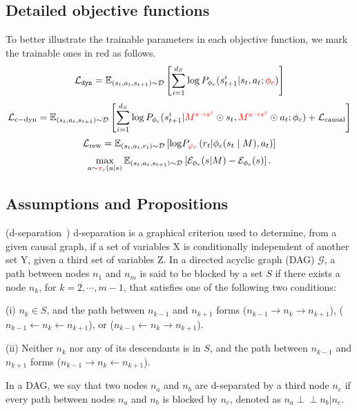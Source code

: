 \subsection{Detailed objective functions}
To better illustrate the trainable parameters in each objective function, we mark the trainable ones in red as follows. 
\begin{equation}
\mathcal{L}_{\texttt{dyn}}= \mathbb{E}_{{(s_t, a_t, s_{t+1})} \sim \mathcal{D} } \left[\sum_{i=1}^{d_S} \log P_{\phi_c}(s_{t+1}^{i} | s_t, a_t; \textcolor{red}{{\phi_c}}) \right]
\end{equation}
\begin{equation}
\mathcal{L}_{\rm{c-dyn}}= \mathbb{E}_{(s_t, a_t, s_{t+1}) \sim \mathcal{D} } \left[\sum_{i=1}^{d_S} \log P_{\phi_{\rm{c}}}(s_{t+1}^{i} | \textcolor{red}{M^{s\to s^j}} \odot s_t, \textcolor{red}{M^{a\to s^j}} \odot a_t; \phi_{\rm{c}}) + \mathcal{L}_{\rm{causal}} \right]
\end{equation}
\begin{equation}
    \mathcal{L}_{\rm{rew}}= \mathbb{E}_{(s_t, a_t, r_t) \sim \mathcal{D}} \left[ \mathrm{log}P_{\textcolor{red}{\varphi_{r}}} \left(r_{t} | \phi_c(s_t \mid M),a_t\right)  
    \right]
\end{equation}
\begin{equation}
    \max_{a \sim \textcolor{red}{\pi_e}(a|s)} \mathbb{E}_{(s_t, a_t, s_{t+1}) \sim \mathcal{D}} \left[\mathcal{E}_{\phi_c}(s|M) - \mathcal{E}_{\phi_c}(s) \right].
\end{equation}

\subsection{Assumptions and Propositions}
\begin{assumption}
(d-separation~\citep{pearl2009causality}) d-separation is a graphical criterion used to determine, from a given causal graph, if a set of variables X is conditionally independent of another set Y, given a third set of variables Z. 
In a directed acyclic graph (DAG) $\mathcal{G}$, a path between nodes $n_1$ and $n_m$ is said to be blocked by a set $S$ if there exists a node $n_k$, for $k = 2, \cdots, m-1$, that satisfies one of the following two conditions:

(i) $n_k \in S$, and the path between $n_{k-1}$ and $n_{k+1}$ forms ($n_{k-1} \rightarrow n_k \rightarrow n_{k+1}$), ($n_{k-1} \leftarrow n_k \leftarrow n_{k+1}$), or ($n_{k-1} \leftarrow n_k \rightarrow n_{k+1}$). 

(ii) Neither $n_k$ nor any of its descendants is in $S$, and the path between $n_{k-1}$ and $n_{k+1}$ forms ($n_{k-1} \rightarrow n_k \leftarrow n_{k+1}$). 

In a DAG, we say that two nodes $n_a$ and $n_b$ are d-separated by a third node $n_c$ if every path between nodes $n_a$ and $n_b$ is blocked by $n_c$, denoted as $n_a  \! \perp \!\!\! \perp n_b|n_c$. 
\end{assumption}

